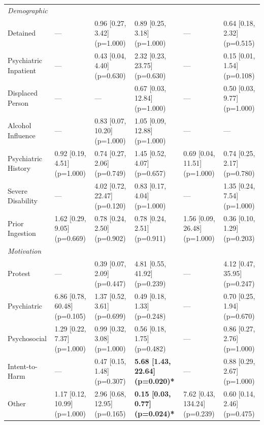 \begin{table}
\begin{tabular}{p{3.5cm} p{4.1cm} p{4.1cm} p{4.1cm} p{4.1cm} p{4.1cm} }
\multicolumn{6}{l}{\textit{Demographic}} \\
\hspace{1em}Detained & --- & 0.96 [0.27, 3.42] (p=1.000) & 0.89 [0.25, 3.18] (p=1.000) & --- & 0.64 [0.18, 2.32] (p=0.515) \\
\hspace{1em}Psychiatric Inpatient & --- & 0.43 [0.04, 4.40] (p=0.630) & 2.32 [0.23, 23.75] (p=0.630) & --- & 0.15 [0.01, 1.54] (p=0.108) \\
\hspace{1em}Displaced Person & --- & --- & 0.67 [0.03, 12.84] (p=1.000) & --- & 0.50 [0.03, 9.77] (p=1.000) \\
\hspace{1em}Alcohol Influence & --- & 0.83 [0.07, 10.20] (p=1.000) & 1.05 [0.09, 12.88] (p=1.000) & --- & --- \\
\hspace{1em}Psychiatric History & 0.92 [0.19, 4.51] (p=1.000) & 0.74 [0.27, 2.06] (p=0.749) & 1.45 [0.52, 4.07] (p=0.657) & 0.69 [0.04, 11.51] (p=1.000) & 0.74 [0.25, 2.17] (p=0.780) \\
\hspace{1em}Severe Disability & --- & 4.02 [0.72, 22.47] (p=0.120) & 0.83 [0.17, 4.04] (p=1.000) & --- & 1.35 [0.24, 7.54] (p=1.000) \\
\hspace{1em}Prior Ingestion & 1.62 [0.29, 9.05] (p=0.669) & 0.78 [0.24, 2.50] (p=0.902) & 0.78 [0.24, 2.51] (p=0.911) & 1.56 [0.09, 26.48] (p=1.000) & 0.36 [0.10, 1.29] (p=0.203) \\

\multicolumn{6}{l}{\textit{Motivation}} \\
\hspace{1em}Protest & --- & 0.39 [0.07, 2.09] (p=0.447) & 4.81 [0.55, 41.92] (p=0.239) & --- & 4.12 [0.47, 35.95] (p=0.247) \\
\hspace{1em}Psychiatric & 6.86 [0.78, 60.48] (p=0.105) & 1.37 [0.52, 3.61] (p=0.699) & 0.49 [0.18, 1.33] (p=0.248) & --- & 0.70 [0.25, 1.94] (p=0.670) \\
\hspace{1em}Psychosocial & 1.29 [0.22, 7.37] (p=1.000) & 0.99 [0.32, 3.08] (p=1.000) & 0.56 [0.18, 1.75] (p=0.482) & --- & 0.86 [0.27, 2.76] (p=1.000) \\
\hspace{1em}Intent-to-Harm & --- & 0.47 [0.15, 1.48] (p=0.307) & \textbf{5.68 [1.43, 22.64] (p=0.020)*} & --- & 0.88 [0.29, 2.67] (p=1.000) \\
\hspace{1em}Other & 1.17 [0.12, 10.99] (p=1.000) & 2.96 [0.68, 12.95] (p=0.165) & \textbf{0.15 [0.03, 0.77] (p=0.024)*} & 7.62 [0.43, 134.24] (p=0.239) & 0.60 [0.14, 2.46] (p=0.475) \\


\end{tabular}
\end{table}
